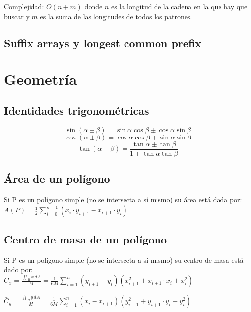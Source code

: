 \documentclass[10pt,letterpaper,twocolumn]{article}
\newcommand{\codigofuente}[1]{

\dotfill
}
\begin{document}
Complejidad: $O(n + m)$ donde $n$ es la longitud de la cadena en la que hay que buscar
y $m$ es la suma de las longitudes de todos los patrones. \\

\codigofuente{./src/strings/aho-corasick.cpp}
\subsection{Suffix arrays y longest common prefix}
\codigofuente{./src/strings/suffix_arrays.cpp}

\section{Geometría}

\subsection{Identidades trigonométricas}

$$ \sin(\alpha \pm \beta) = \sin \alpha \cos \beta \pm \cos \alpha \sin \beta $$
$$ \cos(\alpha \pm \beta) = \cos \alpha \cos \beta \mp \sin \alpha \sin \beta $$
$$ \tan(\alpha \pm \beta) = \frac{\tan \alpha \pm \tan \beta}{1 \mp \tan \alpha \tan \beta} $$


\subsection{Área de un polígono}
Si P es un polígono simple (no se intersecta a sí mismo) su área está dada por: \\

$ A(P) = \frac{1}{2} \displaystyle\sum_{i=0}^{n-1} (x_{i} \cdot y_{i+1} - x_{i+1} \cdot y_{i}) $ \\
\bigskip
\codigofuente{./src/geometria/polygon_area.cpp}

\subsection{Centro de masa de un polígono}
Si P es un polígono simple (no se intersecta a sí mismo) su centro de masa está dado por: \\

$ \displaystyle\bar{C}_{x} = \frac{ \displaystyle\iint_{R} x \, dA }{M} = \frac{1}{6M}\sum_{i=1}^{n} (y_{i+1} - y_{i}) (x_{i+1}^2 + x_{i+1} \cdot x_{i} + x_{i}^2) $

\medskip

$\displaystyle\bar{C}_{y} = \frac{ \displaystyle\iint_{R} y \, dA }{M} = \frac{1}{6M} \sum_{i=1}^{n} (x_{i} - x_{i+1}) (y_{i+1}^2 + y_{i+1} \cdot y_{i} + y_{i}^2)$
\end{document}
